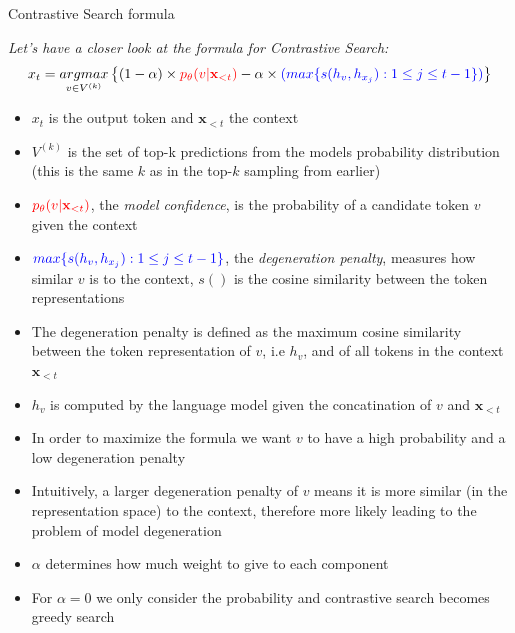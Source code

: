 
\begin{vbframe}{Contrastive Search formula}


\hspace{}

\textit{Let's have a closer look at the formula for Contrastive Search:}
\small
$$x_t = \underset{v \in V^{(k)}}{argmax}\left\{(1 - \alpha) \times \textcolor{red}{p_\theta(v|\mathbf{x}_{<t})} - \alpha \times \textcolor{blue}{(max\{s(h_v,h_{x_j}):1\leq j \leq t-1\})}\right\}$$

\begin{itemize}
    \item $x_t$ is the output token and $\mathbf{x}_{<t}$ the context
    \item $V^{(k)}$ is the set of top-k predictions from the models probability distribution (this is the same $k$ as in the top-$k$ sampling from earlier)
    \item $\textcolor{red}{p_\theta(v|\mathbf{x}_{<t})}$, the \textit{model confidence}, is the probability of a candidate token $v$ given the context
    \item $\textcolor{blue}{max\{s(h_v,h_{x_j}):1\leq j \leq t-1\}}$, the \textit{degeneration penalty}, measures how similar $v$ is to the context, $s()$ is the cosine similarity between the token representations
    \item The degeneration penalty is defined as the maximum cosine similarity between the token representation of $v$, i.e $h_v$, and of all tokens in the context $\mathbf{x}_{<t}$
    \item $h_v$ is computed by the language model given the concatination of $v$ and $\mathbf{x}_{<t}$
    \item In order to maximize the formula we want $v$ to have a high probability and a low degeneration penalty
    \item Intuitively, a larger degeneration penalty of $v$ means it is more similar (in the representation space) to the context, therefore more likely leading to the problem of model degeneration
    \item $\alpha$ determines how much weight to give to each component
    \item For $\alpha = 0$ we only consider the probability and contrastive search becomes greedy search
\end{itemize}

\vfill

\end{vbframe}

